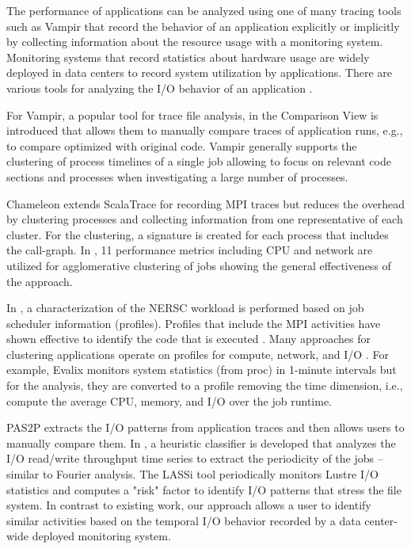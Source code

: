 \documentclass{jhps}
\begin{document}

The performance of applications can be analyzed using one of many tracing tools such as Vampir \cite{weber2017visual} that record the behavior of an application explicitly or implicitly by collecting information about the resource usage with a monitoring system.
Monitoring systems that record statistics about hardware usage are widely deployed in data centers to record system utilization by applications.
There are various tools for analyzing the I/O behavior of an application \cite{TFAPIKBBCF19}.

For Vampir, a popular tool for trace file analysis, in \cite{weber2017visual} the Comparison View is introduced that allows them to manually compare traces of application runs, e.g., to compare optimized with original code.
Vampir generally supports the clustering of process timelines of a single job allowing to focus on relevant code sections and processes when investigating a large number of processes.

Chameleon \cite{bahmani2018chameleon} extends ScalaTrace for recording MPI traces but reduces the overhead by clustering processes and collecting information from one representative of each cluster.
For the clustering, a signature is created for each process that includes the call-graph.
In \cite{halawa2020unsupervised}, 11 performance metrics including CPU and network are utilized for agglomerative clustering of jobs showing the general effectiveness of the approach.

In \cite{rodrigo2018towards}, a characterization of the NERSC workload is performed based on job scheduler information (profiles).
Profiles that include the MPI activities have shown effective to identify the code that is executed \cite{demasi2013identifying}.
Many approaches for clustering applications operate on profiles for compute, network, and I/O \cite{emeras2015evalix,liu2020characterization,bang2020hpc}.
For example, Evalix \cite{emeras2015evalix} monitors system statistics (from proc) in 1-minute intervals but for the analysis, they are converted to a profile removing the time dimension, i.e., compute the average CPU, memory, and I/O over the job runtime.

PAS2P \cite{mendez2012new} extracts the I/O patterns from application traces and then allows users to manually compare them.
In \cite{white2018automatic}, a heuristic classifier is developed that analyzes the I/O read/write throughput time series to extract the periodicity of the jobs -- similar to Fourier analysis.
The LASSi tool \cite{AOPIUOTUNS19} periodically monitors Lustre I/O statistics and computes a "risk" factor to identify I/O patterns that stress the file system.
In contrast to existing work, our approach allows a user to identify similar activities based on the temporal I/O behavior recorded by a data center-wide deployed monitoring system.
\end{document}
